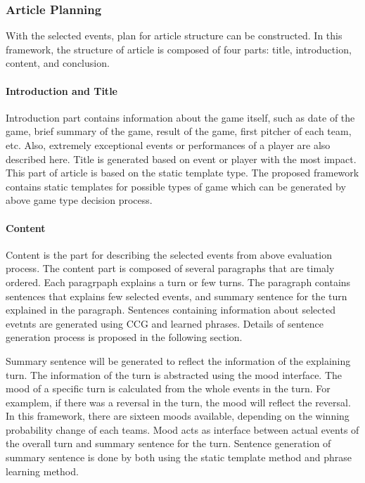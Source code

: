\documentclass[11pt,letterpaper]{article}
\begin{document}
\subsubsection{Article Planning}

With the selected events, plan for article structure can be constructed. In this framework, the structure of article is composed of four parts: title, introduction, content, and conclusion. 

\paragraph{Introduction and Title} 

Introduction part contains information about the game itself, such as date of the game, brief summary of the game, result of the game, first pitcher of each team, etc. Also, extremely exceptional events or performances of a player are also described here. Title is generated based on event or player with the most impact. This part of article is based on the static template type. The proposed framework contains static templates for possible types of game which can be generated by above game type decision process. 

\paragraph{Content} 

Content is the part for describing the selected events from above evaluation process. The content part is composed of several paragraphs that are timaly ordered. Each paragrpaph explains a turn or few turns. The paragraph contains sentences that explains few selected events, and summary sentence for the turn explained in the paragraph. Sentences containing information about selected evetnts are generated using CCG and learned phrases. Details of sentence generation process is proposed in the following section. 

Summary sentence will be generated to reflect the information of the explaining turn. The information of the turn is abstracted using the mood interface. The mood of a specific turn is calculated from the whole events in the turn. For examplem, if there was a reversal in the turn, the mood will reflect the reversal. In this framework, there are sixteen moods available, depending on the winning probability change of each teams. Mood acts as interface between actual events of the overall turn and summary sentence for the turn. Sentence generation of summary sentence is done by both using the static template method and phrase learning method. 
\end{document}
